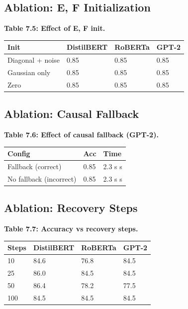 \subsection{Ablation: E, F Initialization}

\textbf{Table 7.5: Effect of E, F init.}

\begin{table}[H]
\centering
\small
\begin{tabular}{llll}
\toprule
\textbf{Init} & \textbf{DistilBERT} & \textbf{RoBERTa} & \textbf{GPT-2} \\
\midrule
Diagonal + noise & 0.85 & 0.85 & 0.85 \\
Gaussian only & 0.85 & 0.85 & 0.85 \\
Zero & 0.85 & 0.85 & 0.85 \\
\bottomrule
\end{tabular}
\end{table}

\subsection{Ablation: Causal Fallback}

\textbf{Table 7.6: Effect of causal fallback (GPT-2).}

\begin{table}[H]
\centering
\small
\begin{tabular}{lll}
\toprule
\textbf{Config} & \textbf{Acc} & \textbf{Time} \\
\midrule
Fallback (correct) & 0.85 & 2.3 s s \\
No fallback (incorrect) & 0.85 & 2.3 s s \\
\bottomrule
\end{tabular}
\end{table}

\subsection{Ablation: Recovery Steps}

\textbf{Table 7.7: Accuracy vs recovery steps.}

\begin{table}[H]
\centering
\small
\begin{tabular}{llll}
\toprule
\textbf{Steps} & \textbf{DistilBERT} & \textbf{RoBERTa} & \textbf{GPT-2} \\
\midrule
10 & 84.6 & 76.8 & 84.5 \\
25 & 86.0 & 84.5 & 84.5 \\
50 & 86.4 & 78.2 & 77.5 \\
100 & 84.5 & 84.5 & 84.5 \\
\bottomrule
\end{tabular}
\end{table}

